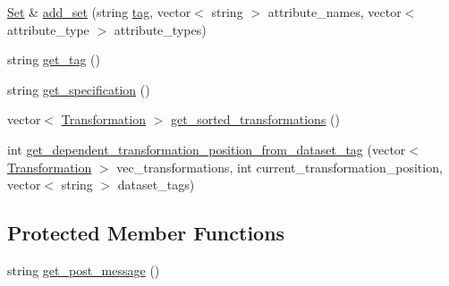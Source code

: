 \begin{DoxyCompactItemize}
\hyperlink{classSet}{Set} \& \hyperlink{classDataflow_a8621d2a61fbc9ec4ce8b21662d5804b9}{add\+\_\+set} (string \hyperlink{classDataflow_a45d9ba19359e42a9a8d1fa089c994b17}{tag}, vector$<$ string $>$ attribute\+\_\+names, vector$<$ attribute\+\_\+type $>$ attribute\+\_\+types)
\item 
string \hyperlink{classDataflow_a0d4fcfeba2d4fe22283c925d22eca17d}{get\+\_\+tag} ()
\item 
string \hyperlink{classDataflow_aa1023af477da09f5dcb63b048e19692e}{get\+\_\+specification} ()
\item 
vector$<$ \hyperlink{classTransformation}{Transformation} $>$ \hyperlink{classDataflow_a947b0d9382901eb90277f648b40f6946}{get\+\_\+sorted\+\_\+transformations} ()
\item 
int \hyperlink{classDataflow_af25c9cda8407c89e7099d680270e1a38}{get\+\_\+dependent\+\_\+transformation\+\_\+position\+\_\+from\+\_\+dataset\+\_\+tag} (vector$<$ \hyperlink{classTransformation}{Transformation} $>$ vec\+\_\+transformations, int current\+\_\+transformation\+\_\+position, vector$<$ string $>$ dataset\+\_\+tags)
\end{DoxyCompactItemize}
\subsection*{Protected Member Functions}
\begin{DoxyCompactItemize}
\item 
string \hyperlink{classDataflow_ace58f5775ef9eb6fb155d9280c5f2842}{get\+\_\+post\+\_\+message} ()
\end{DoxyCompactItemize}
